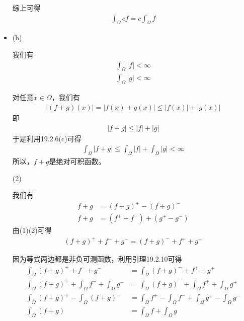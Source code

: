 \documentclass{article}
\begin{document}
\begin{itemize}
        综上可得
        \begin{align*}
          \int_{\Omega} c f = c \int_{\Omega} f
        \end{align*}

  \item (b)

        我们有
        \begin{align*}
          \int_{\Omega} |f| < \infty \\
          \int_{\Omega} |g| < \infty
        \end{align*}

        对任意$x \in \Omega$，我们有
        \begin{align*}
          |(f + g)(x)| = |f(x) + g(x)| \leq |f(x)| + |g(x)|
        \end{align*}
        即
        \begin{align*}
          |f + g| \leq |f| + |g|
        \end{align*}
        于是利用19.2.6(c)可得
        \begin{align*}
          \int_{\Omega} |f + g| \leq \int_{\Omega} |f| + \int_{\Omega} |g| < \infty
        \end{align*}
        所以，$f + g$是绝对可积函数。

        (2)

        我们有
        \begin{align}
          f + g & = (f + g)^+ - (f + g)^-     \\
          f + g & = (f^+ - f^-) + (g^+ - g^-)
        \end{align}
        由(1)(2)可得
        \begin{align*}
          (f + g)^+ + f^- + g^- = (f+g)^- + f^+ + g^+
        \end{align*}

        因为等式两边都是非负可测函数，利用引理19.2.10可得
        \begin{align*}
          \int_{\Omega} (f + g)^+ + f^- + g^-                             & = \int_{\Omega} (f+g)^- + f^+ + g^+                                             \\
          \int_{\Omega} (f + g)^+ + \int_{\Omega} f^- + \int_{\Omega} g^- & = \int_{\Omega} (f+g)^- + \int_{\Omega} f^+ + \int_{\Omega} g^+                 \\
          \int_{\Omega} (f + g)^+ - \int_{\Omega} (f+g)^-                 & = \int_{\Omega} f^+ - \int_{\Omega} f^- + \int_{\Omega} g^+ - \int_{\Omega} g^- \\
          \int_{\Omega} (f + g)                                           & = \int_{\Omega} f + \int_{\Omega} g
        \end{align*}


\end{itemize}
\end{document}
